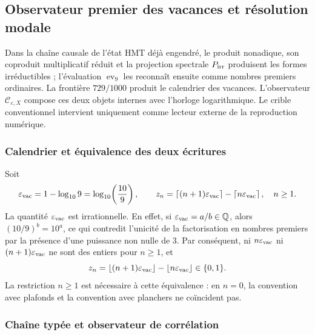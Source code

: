 \subsection{Observateur premier des vacances et résolution modale}
\label{sec:f051-prime-vacancy-observer}

Dans la chaîne causale de l’état HMT déjà engendré, le produit nonadique, son
coproduit multiplicatif réduit et la projection spectrale
\(P_{\rm irr}\) produisent les formes irréductibles ; l’évaluation
\(\operatorname{ev}_9\) les reconnaît ensuite comme nombres premiers ordinaires. La
frontière \(729/1000\) produit le calendrier des vacances. L’observateur
\(\mathcal C_{\varepsilon,X}\) compose ces deux objets internes avec l’horloge
logarithmique. Le crible conventionnel intervient uniquement comme lecteur
externe de la reproduction numérique.

\subsubsection{Calendrier et équivalence des deux écritures}

Soit
\begin{equation}
 \varepsilon_{\rm vac}
 =1-\log_{10}9
 =\log_{10}\!\left(\frac{10}{9}\right),
 \qquad
 z_n=\left\lceil(n+1)\varepsilon_{\rm vac}\right\rceil
      -\left\lceil n\varepsilon_{\rm vac}\right\rceil ,
 \quad n\geq1.
 \label{eq:f051-epsilon-calendar}
\end{equation}
La quantité \(\varepsilon_{\rm vac}\) est irrationnelle. En effet, si
\(\varepsilon_{\rm vac}=a/b\in\mathbb Q\), alors
\((10/9)^b=10^a\), ce qui contredit l’unicité de la factorisation
en nombres premiers par la présence d’une puissance non nulle de \(3\). Par conséquent,
ni \(n\varepsilon_{\rm vac}\) ni
\((n+1)\varepsilon_{\rm vac}\) ne sont des entiers pour \(n\geq1\), et
\begin{equation}
 z_n=\left\lfloor(n+1)\varepsilon_{\rm vac}\right\rfloor
      -\left\lfloor n\varepsilon_{\rm vac}\right\rfloor
 \in\{0,1\}.
 \label{eq:f051-ceil-floor}
\end{equation}
La restriction \(n\geq1\) est nécessaire à cette équivalence : en
\(n=0\), la convention avec plafonds et la convention avec planchers ne coïncident pas.

\subsubsection{Chaîne typée et observateur de corrélation}

